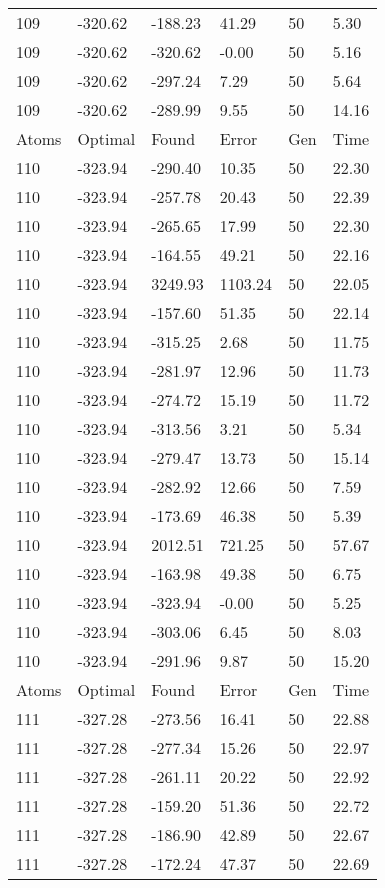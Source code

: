 \documentclass{report}
\begin{document}
\begin{appendix}
\begin{longtable}{llllll}
109 & -320.62 & -188.23 & 41.29 & 50 & 5.30 \\
109 & -320.62 & -320.62 & -0.00 & 50 & 5.16 \\
109 & -320.62 & -297.24 & 7.29 & 50 & 5.64 \\
109 & -320.62 & -289.99 & 9.55 & 50 & 14.16 \\
Atoms & Optimal & Found & Error & Gen & Time \\
110 & -323.94 & -290.40 & 10.35 & 50 & 22.30 \\
110 & -323.94 & -257.78 & 20.43 & 50 & 22.39 \\
110 & -323.94 & -265.65 & 17.99 & 50 & 22.30 \\
110 & -323.94 & -164.55 & 49.21 & 50 & 22.16 \\
110 & -323.94 & 3249.93 & 1103.24 & 50 & 22.05 \\
110 & -323.94 & -157.60 & 51.35 & 50 & 22.14 \\
110 & -323.94 & -315.25 & 2.68 & 50 & 11.75 \\
110 & -323.94 & -281.97 & 12.96 & 50 & 11.73 \\
110 & -323.94 & -274.72 & 15.19 & 50 & 11.72 \\
110 & -323.94 & -313.56 & 3.21 & 50 & 5.34 \\
110 & -323.94 & -279.47 & 13.73 & 50 & 15.14 \\
110 & -323.94 & -282.92 & 12.66 & 50 & 7.59 \\
110 & -323.94 & -173.69 & 46.38 & 50 & 5.39 \\
110 & -323.94 & 2012.51 & 721.25 & 50 & 57.67 \\
110 & -323.94 & -163.98 & 49.38 & 50 & 6.75 \\
110 & -323.94 & -323.94 & -0.00 & 50 & 5.25 \\
110 & -323.94 & -303.06 & 6.45 & 50 & 8.03 \\
110 & -323.94 & -291.96 & 9.87 & 50 & 15.20 \\
Atoms & Optimal & Found & Error & Gen & Time \\
111 & -327.28 & -273.56 & 16.41 & 50 & 22.88 \\
111 & -327.28 & -277.34 & 15.26 & 50 & 22.97 \\
111 & -327.28 & -261.11 & 20.22 & 50 & 22.92 \\
111 & -327.28 & -159.20 & 51.36 & 50 & 22.72 \\
111 & -327.28 & -186.90 & 42.89 & 50 & 22.67 \\
111 & -327.28 & -172.24 & 47.37 & 50 & 22.69 \\

\end{longtable}
\end{appendix}
\end{document}
